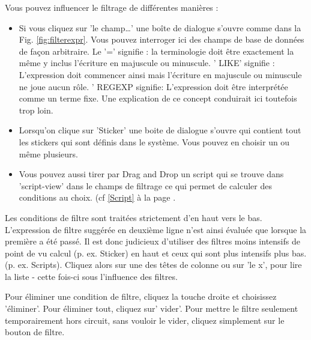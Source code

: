 Vous pouvez influencer le filtrage de différentes manières :
\begin{itemize}
\item Si vous cliquez sur 'le champ…' une boîte de dialogue s'ouvre comme dans la Fig. \ref{fig:filterexpr}. Vous pouvez interroger ici des champs de base de données de façon arbitraire. Le '=' signifie : la terminologie doit être exactement la même y inclus l'écriture en majuscule ou minuscule. ' LIKE' signifie : L'expression doit commencer ainsi mais l'écriture en majuscule ou minuscule ne joue aucun rôle.  ' REGEXP signifie: L'expression doit être interprétée comme un terme fixe. Une explication de ce concept conduirait ici toutefois trop loin.


\item Lorsqu'on clique sur 'Sticker' une boite de dialogue s'ouvre qui contient tout les stickers qui sont définis dans le système. Vous pouvez en choisir un ou même plusieurs.
\item Vous pouvez aussi tirer par Drag and Drop un script qui se trouve dans 'script-view' dans le champs de filtrage ce qui permet de calculer des conditions au choix. (cf \ref{Script} à la page \pageref{Script}.
\end{itemize}

Les conditions de filtre sont traitées strictement d'en haut vers le bas. L'expression de filtre
suggérée en deuxième ligne n'est ainsi évaluée que lorsque la première a été passé. Il est donc judicieux d'utiliser des filtres moins intensifs de point de vu calcul (p. ex. Sticker) en haut et ceux qui sont plus intensifs plus bas.(p. ex. Scripts). Cliquez alors sur une des têtes de colonne ou sur 'le x', pour lire la liste -
cette fois-ci sous l'influence des filtres.


\medskip

Pour éliminer une condition de filtre, cliquez la touche droite et choisissez 'éliminer'. Pour éliminer tout, cliquez sur' vider'. Pour mettre le filtre seulement temporairement hors circuit, sans vouloir le vider, cliquez simplement sur le bouton de filtre.


